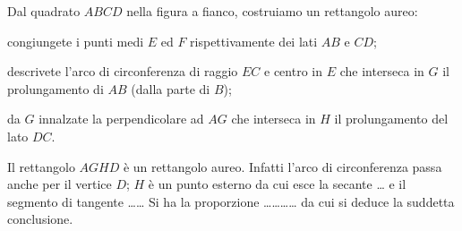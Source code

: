 \noindent\begin{minipage}{0.7\textwidth}\parindent15pt
\begin{esercizio}
\label{ese:6.112}
Dal quadrato \(ABCD\) nella figura a fianco, costruiamo un rettangolo 
aureo:
\begin{enumerate*}
\item congiungete i punti medi \(E\) ed \(F\) rispettivamente dei lati 
\(AB\) e \(CD\);
\item descrivete l'arco di circonferenza di raggio \(EC\) e centro in 
\(E\) che interseca in \(G\) il prolungamento di \(AB\) (dalla parte di 
\(B\));
\item da \(G\) innalzate la perpendicolare ad \(AG\) che interseca in \(H\) 
il prolungamento del lato \(DC\).
\end{enumerate*}
Il rettangolo \(AGHD\) è un rettangolo aureo. Infatti l'arco di 
circonferenza passa anche per il vertice \(D\); \(H\) è un punto esterno 
da cui esce la secante \ldots{} e il segmento di tangente 
\ldots\ldots{}
Si ha la proporzione \ldots\ldots\ldots\ldots{} da cui si deduce la 
suddetta conclusione.
\end{esercizio}
\end{minipage}\hfil
\begin{minipage}{0.3\textwidth}
	\centering
\end{minipage}

